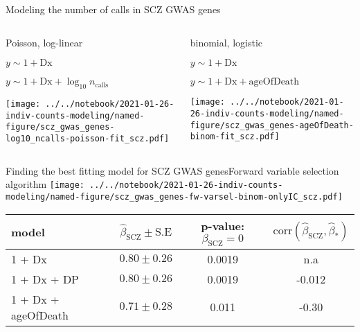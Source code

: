 \documentclass[usenames,dvipsnames]{beamer}
\begin{document}
\begin{frame}{Modeling the number of calls in SCZ GWAS genes}
\begin{columns}[t]
\begin{column}{0.5\textwidth}
\begin{center}
Poisson, log-linear
\begin{description}
\tiny
\item[M0] \(y \sim 1 + \mathrm{Dx}\)
\item[M1] \(y \sim 1 + \mathrm{Dx} + \log_{10} n_\mathrm{calls}\)
\end{description}
\end{center}
\texttt{[image: ../../notebook/2021-01-26-indiv-counts-modeling/named-figure/scz\_gwas\_genes-log10\_ncalls-poisson-fit\_scz.pdf]}
\end{column}

\begin{column}{0.5\textwidth}
\begin{center}
binomial, logistic
\begin{description}
\tiny
\item[M0] \(y \sim 1 + \mathrm{Dx}\)
\item[M1] \(y \sim 1 + \mathrm{Dx} + \mathrm{ageOfDeath}\)
\end{description}
\end{center}
\texttt{[image: ../../notebook/2021-01-26-indiv-counts-modeling/named-figure/scz\_gwas\_genes-ageOfDeath-binom-fit\_scz.pdf]}
\end{column}
\end{columns}
\begin{center}
\end{center}
\end{frame}

\begin{frame}{Finding the best fitting model for SCZ GWAS genes}{Forward variable selection algorithm}
\small
\texttt{[image: ../../notebook/2021-01-26-indiv-counts-modeling/named-figure/scz\_gwas\_genes-fw-varsel-binom-onlyIC\_scz.pdf]}

\begin{center}
\begin{tabular}{l|ccc}
	\small
model & \(\hat{\beta}_\mathrm{SCZ} \pm \mathrm{S.E}\) & p-value:
\(\beta_\mathrm{SCZ} = 0\) &
\(\mathrm{corr}(\hat{\beta}_\mathrm{SCZ}, \hat{\beta}_\ast)\) \\
\hline
1 + Dx & \(0.80 \pm 0.26\) & 0.0019 & n.a \\
1 + Dx + DP & \(0.80 \pm 0.26\) & 0.0019 & -0.012 \\
1 + Dx + ageOfDeath & \(0.71 \pm 0.28\) & 0.011 & -0.30 \\
\end{tabular}
\end{center}
\end{frame}
\end{document}
